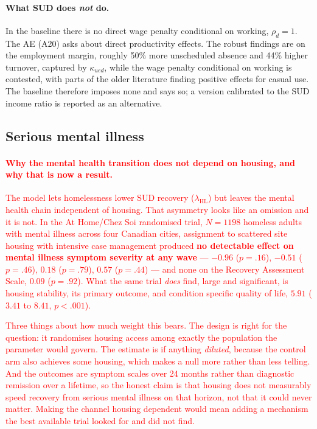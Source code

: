 \documentclass[11pt]{article}
\newcommand{\nw}[1]{\textcolor{red}{#1}}
\begin{document}
\paragraph{What SUD does \emph{not} do.} In the baseline there is no direct wage
penalty conditional on working, $\rho_d=1$. The AE (A20) asks about direct
productivity effects. The robust findings are on the employment margin, roughly 50\% more unscheduled absence and 44\% higher turnover, captured by
$\kappa_{ued}$, while the wage penalty conditional on working is contested,
with parts of the older literature finding positive effects for casual use. The
baseline therefore imposes none and says so; a version calibrated to the SUD
income ratio is reported as an alternative.

\subsection{Serious mental illness}

\nw{\paragraph{Why the mental health transition does not depend on housing, and
why that is now a result.} The model lets homelessness lower SUD recovery
($\lambda_{\text{HL}}$) but leaves the mental health chain independent of
housing. That asymmetry looks like an omission and it is not. In the At
Home/Chez Soi randomised trial, $N=1198$ homeless adults with mental illness
across four Canadian cities, assignment to scattered site housing with intensive
case management produced \textbf{no detectable effect on mental illness symptom
severity at any wave} --- $-0.96$ ($p=.16$), $-0.51$ ($p=.46$), $0.18$
($p=.79$), $0.57$ ($p=.44$) --- and none on the Recovery Assessment Scale,
$0.09$ ($p=.92$). What the same trial \emph{does} find, large and significant, is
housing stability, its primary outcome, and condition specific quality of life,
$5.91$ ($3.41$ to $8.41$, $p<.001$).}

\nw{Three things about how much weight this bears. The design is right for the
question: it randomises housing access among exactly the population the
parameter would govern. The estimate is if anything \emph{diluted}, because the
control arm also achieves some housing, which makes a null more rather than less
telling. And the outcomes are symptom scales over 24 months rather than
diagnostic remission over a lifetime, so the honest claim is that housing does
not measurably speed recovery from serious mental illness on that horizon,
not that it could never matter. Making the channel housing dependent would mean
adding a mechanism the best available trial looked for and did not find.}
\end{document}
